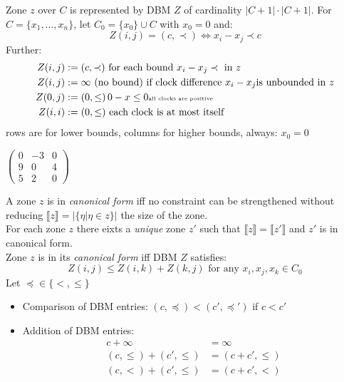 \documentclass[a4paper, 10pt]{article}
\begin{document}
\begin{mdframed}[roundcorner=5pt,
subtitlebelowline=false,subtitleaboveline=false,
subtitlebackgroundcolor=blue!30,
frametitlerule=true,
frametitlebackgroundcolor=blue!30,
frametitle={Difference Bound Matrices}
]
Zone $z$ over $C$ is represented by DBM $Z$ of cardinality $|C+1|\cdot|C+1|$. For $C=\{x_1,\dots,x_n\}$, let $C_0=\{x_0\}\cup C$ with $x_0=0$ and:
\[ Z(i,j) = (c,\prec) \iff x_i-x_j\prec c \]
Further:
\begin{align*}
Z(i,j) &:= (c,\prec) \text{ for each bound } x_i-x_j\prec \text { in } z \\
Z(i,j) &:= \infty \text{ (no bound) if clock difference } x_i-x_j \text{is unbounded in } z \\
Z(0,j) &:= (0,\leq)\, 0-x\leq 0 \text{\tiny all clocks are positive} \\
Z(i,i) &:= (0,\leq) \text{ each clock is at most itself}
\end{align*}
rows are for lower bounds, columns for higher bounds, always: $x_0=0$
\begin{center}
\hspace{-2em}
\raisebox{-.5\height}{\scalebox{.7}{}}
\follows $\begin{pmatrix}
0 & -3 & 0 \\ 9 & 0 & 4 \\ 5 & 2 & 0
\end{pmatrix}$
\end{center}
A zone $z$ is in \emph{canonical form} iff no constraint can be strengthened without reducing $\llbracket z\rrbracket = |\{\eta|\eta\in z\}|$ {\tiny the size of the zone}. \\
For each zone $z$ there eixts a \emph{unique} zone $z'$ such that $\llbracket z\rrbracket = \llbracket z'\rrbracket$ and $z'$ is in canonical form.\\
Zone $z$ is in its \emph{canonical form} iff DBM $Z$ satisfies:
\[ Z(i,j) \leq Z(i,k)+Z(k,j) \text{ for any } x_i,x_j,x_k\in C_0 \]
Let $\preceq\in\{<,\leq\}$
\begin{itemize}
    \item Comparison of DBM entries: $(c,\preceq)<(c',\preceq')$ if $c<c'$
    \item Addition of DBM entries:
    \begin{align*}
    c+\infty &= \infty \\
    (c,\leq) + (c',\leq) &= (c+c',\leq) \\
    (c,<) + (c',\leq) &= (c+c',<)
    \end{align*}
\end{itemize}


\end{mdframed}
\end{document}
